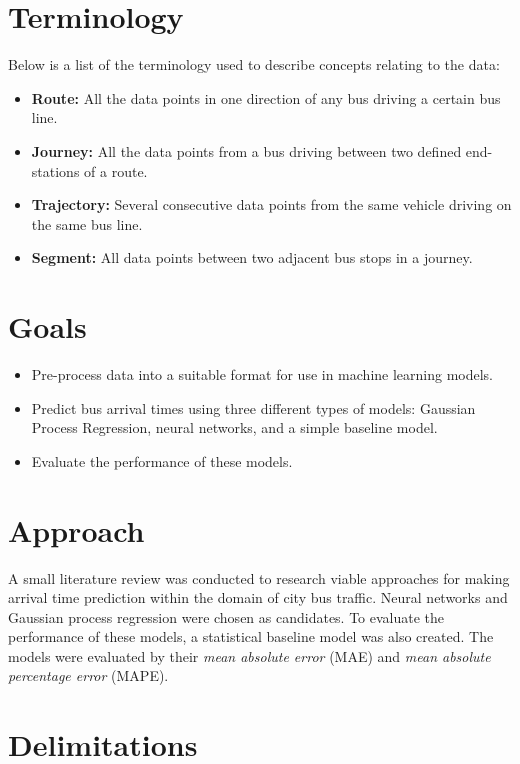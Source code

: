 \section{Terminology}
\label{sec:terminology}
Below is a list of the terminology used to describe concepts relating to the data:
\begin{itemize}
\item \textbf{Route:} All the data points in one direction of any bus driving a certain bus line.
\item \textbf{Journey:} All the data points from a bus driving between two defined end-stations of a route.
\item \textbf{Trajectory:} Several consecutive data points from the same vehicle driving on the same bus line.
\item \textbf{Segment:} All data points between two adjacent bus stops in a journey.
\\
\end{itemize}

\section{Goals}
\label{sec:aim}

\begin{itemize}[]
  \item Pre-process data into a suitable format for use in machine learning models.
  \item Predict bus arrival times using three different types of models: Gaussian Process Regression, neural networks, and a simple baseline model.
  \item Evaluate the performance of these models.
\end{itemize}

\section{Approach}
\label{sec:research-questions}

A small literature review was conducted to research viable approaches for making arrival time prediction within the domain of city bus traffic. Neural networks and Gaussian process regression were chosen as candidates. To evaluate the performance of these models, a statistical baseline model was also created. The models were evaluated by their \textit{mean absolute error} (MAE) and \textit{mean absolute percentage error} (MAPE). 


\section{Delimitations}
\label{sec:delimitations}


